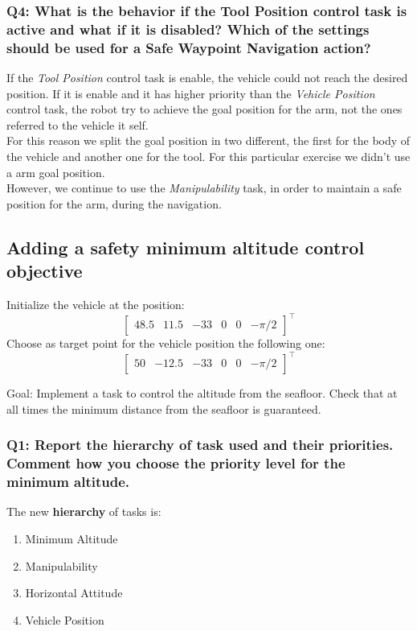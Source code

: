 \documentclass{article}
\begin{document}
\subsubsection{Q4: What is the behavior if the Tool Position control task is active and what if it is disabled? Which of the settings should be used for a Safe Waypoint Navigation action?}
If the \textit{Tool Position} control task is enable, the vehicle could not reach the desired position. If it is enable and it has higher priority than the \textit{Vehicle Position} control task, the robot try to achieve the goal position for the arm, not the ones referred to the vehicle it self. \\
For this reason we split the goal position in two different, the first for the body of the vehicle and another one for the tool. For this particular exercise we didn't use a arm goal position. \\
However, we continue to use the \textit{Manipulability} task, in order to maintain a safe position for the arm, during the navigation.
\clearpage

\subsection{Adding a safety minimum altitude control objective}
Initialize the vehicle at the position:
\begin{displaymath}
\begin{bmatrix} 48.5 & 11.5 & -33 & 0 & 0 &-\pi/2\end{bmatrix}^\top
\end{displaymath} 
Choose as target point for the vehicle position the following one:
\begin{displaymath}
\begin{bmatrix} 50 & -12.5 & -33 & 0 & 0 &-\pi/2 \end{bmatrix}^\top
\end{displaymath}

Goal: Implement a task to control the altitude from the seafloor. Check that at all times the minimum distance from the seafloor is guaranteed.

\subsubsection{Q1: Report the hierarchy of task used and their priorities. Comment how you choose the priority level for the minimum altitude.}

\noindent
\vspace{5px}
The new \textbf{hierarchy} of tasks is:
\begin{enumerate}
	\item Minimum Altitude
	\item Manipulability
	\item Horizontal Attitude
	\item Vehicle Position
\end{enumerate}
\end{document}

